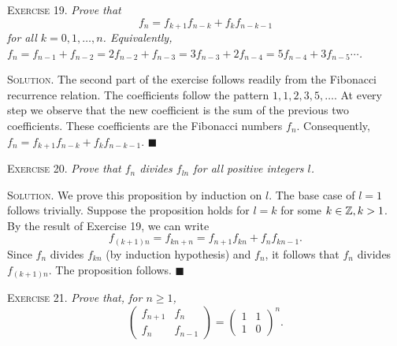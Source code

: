 \documentclass[11pt, leqno]{article}
\newcommand{\done}{\ensuremath{\blacksquare}}
\begin{document}
\textsc{Exercise 19}. \emph{Prove that 
\begin{displaymath}
f_n = f_{k+1}f_{n-k} + f_kf_{n-k-1}
\end{displaymath}
for all $k=0,1,\ldots, n$. Equivalently, $f_n = f_{n-1} + f_{n-2} = 2f_{n-2} + f_{n-3} = 3f_{n-3} + 2f_{n-4} = 5f_{n-4} + 3f_{n-5} \cdots$.}

\textsc{Solution}. The second part of the exercise follows readily from the Fibonacci recurrence relation. The coefficients follow the pattern $1, 1, 2, 3, 5, \ldots$. At every step we observe that the new coefficient is the sum of the previous two coefficients. These coefficients are the Fibonacci numbers $f_n$. Consequently, $f_n = f_{k+1}f_{n-k} + f_kf_{n-k-1}$. \done

\textsc{Exercise 20}. \emph{Prove that $f_n$ divides $f_{ln}$ for all positive integers $l$.}

\textsc{Solution}. We prove this proposition by induction on $l$. The base case of $l = 1$ follows trivially. Suppose the proposition holds for $l = k$ for some $k\in \mathbb{Z}, k>1$. By the result of Exercise 19, we can write 
\begin{displaymath}
  f_{(k+1)n} = f_{kn+n} = f_{n+1}f_{kn} + f_nf_{kn-1}. 
\end{displaymath}
Since $f_n$ divides $f_{kn}$ (by induction hypothesis) and $f_n$, it follows that $f_n$ divides $f_{(k+1)n}$. The proposition follows. \done

\textsc{Exercise 21}. \emph{Prove that, for $n\geq 1$, 
\begin{displaymath}
\begin{pmatrix} f_{n+1} & f_n \\ f_n & f_{n-1} \end{pmatrix} = \begin{pmatrix} 1 & 1 \\ 1 & 0 \end{pmatrix}^n.
\end{displaymath}}
\end{document}
